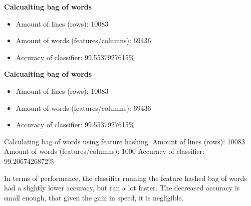 \documentclass{article}
\begin{document}
\newpage
\textbf{Calcualting bag of words}
\begin{itemize}
    \item Amount of lines (rows): 10083
    \item Amount of words (features/columns): 69436
    \item Accuracy of classifier: 99.5537927615\%
\end{itemize}

\textbf{Calcualting bag of words}
\begin{itemize}
    \item Amount of lines (rows): 10083
    \item Amount of words (features/columns): 69436
    \item Accuracy of classifier: 99.5537927615\%
\end{itemize}

Calculating bag of words using feature hashing.
Amount of lines (rows): 10083
Amount of words (features/columns): 1000
Accuracy of classifier: 99.2067426872\%

In terms of performance, the classifier running the feature hashed bag of words had a slightly lower accuracy, but ran a lot faster. The decreased accuracy is small enough, that given the gain in speed, it is negligible.
\end{document}
